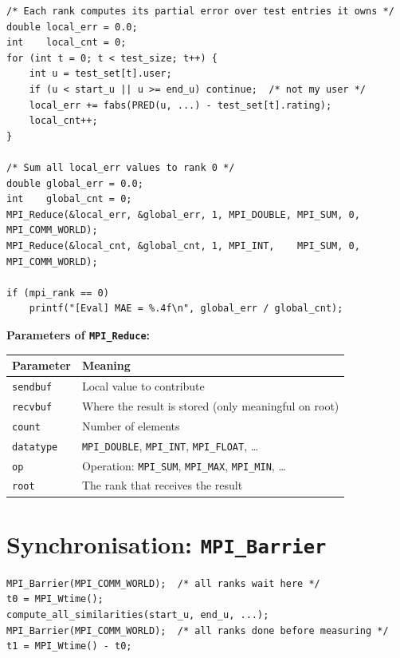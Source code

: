 \documentclass[12pt,a4paper]{article}
\begin{document}
\begin{lstlisting}
/* Each rank computes its partial error over test entries it owns */
double local_err = 0.0;
int    local_cnt = 0;
for (int t = 0; t < test_size; t++) {
    int u = test_set[t].user;
    if (u < start_u || u >= end_u) continue;  /* not my user */
    local_err += fabs(PRED(u, ...) - test_set[t].rating);
    local_cnt++;
}

/* Sum all local_err values to rank 0 */
double global_err = 0.0;
int    global_cnt = 0;
MPI_Reduce(&local_err, &global_err, 1, MPI_DOUBLE, MPI_SUM, 0, MPI_COMM_WORLD);
MPI_Reduce(&local_cnt, &global_cnt, 1, MPI_INT,    MPI_SUM, 0, MPI_COMM_WORLD);

if (mpi_rank == 0)
    printf("[Eval] MAE = %.4f\n", global_err / global_cnt);
\end{lstlisting}

\textbf{Parameters of \texttt{MPI\_Reduce}:}
\begin{center}
\begin{tabular}{ll}
\toprule
Parameter & Meaning \\
\midrule
\texttt{sendbuf} & Local value to contribute \\
\texttt{recvbuf} & Where the result is stored (only meaningful on root) \\
\texttt{count} & Number of elements \\
\texttt{datatype} & \texttt{MPI\_DOUBLE}, \texttt{MPI\_INT}, \texttt{MPI\_FLOAT}, \ldots \\
\texttt{op} & Operation: \texttt{MPI\_SUM}, \texttt{MPI\_MAX}, \texttt{MPI\_MIN}, \ldots \\
\texttt{root} & The rank that receives the result \\
\bottomrule
\end{tabular}
\end{center}

\section{Synchronisation: \texttt{MPI\_Barrier}}

\begin{lstlisting}
MPI_Barrier(MPI_COMM_WORLD);  /* all ranks wait here */
t0 = MPI_Wtime();
compute_all_similarities(start_u, end_u, ...);
MPI_Barrier(MPI_COMM_WORLD);  /* all ranks done before measuring */
t1 = MPI_Wtime() - t0;
\end{lstlisting}
\end{document}

